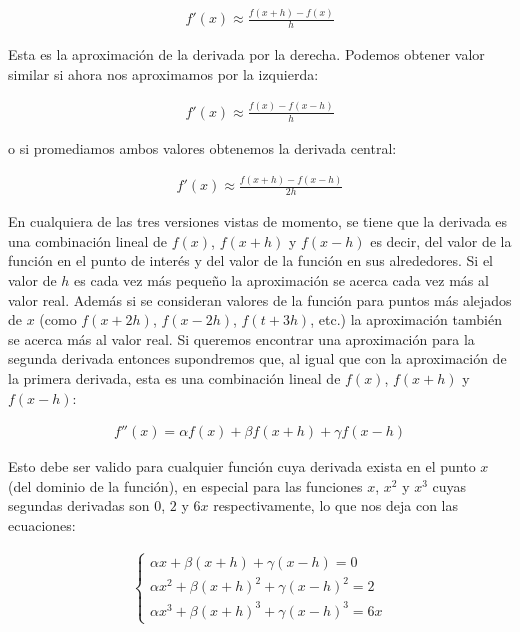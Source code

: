 \documentclass[12pt]{article}
\begin{document}
\begin{align*}
    f'(x) \approx\frac{f(x+h)-f(x)}{h}
\end{align*}

Esta es la aproximación de la derivada por la derecha. Podemos obtener valor similar si ahora nos aproximamos por la izquierda:

\begin{align*}
    f'(x) \approx\frac{f(x)-f(x-h)}{h}
\end{align*}

o si promediamos ambos valores obtenemos la derivada central:

\begin{align*}
    f'(x) \approx\frac{f(x+h)-f(x-h)}{2h}
\end{align*}

En cualquiera de las tres versiones vistas de momento, se tiene que la derivada es una combinación lineal de $f(x)$, $f(x+h)$ y $f(x-h)$ es decir, del valor de la función en el punto de interés y del valor de la función en sus alrededores. Si el valor de $h$ es cada vez más pequeño la aproximación se acerca cada vez más al valor real. Además si se consideran valores de la función para puntos más alejados de $x$ (como $f(x+2h)$, $f(x-2h)$, $f(t+3h)$, etc.) la aproximación también se acerca más al valor real. Si queremos encontrar una aproximación para la segunda derivada entonces supondremos que, al igual que con la aproximación de la primera derivada,  esta es una combinación lineal de $f(x)$, $f(x+h)$ y $f(x-h)$:

\begin{align*}
    f''(x) = \alpha f(x) + \beta f(x+h) + \gamma f(x-h)
\end{align*}

Esto debe ser valido para cualquier función cuya derivada exista en el punto $x$ (del dominio de la función), en especial para las funciones $x$, $x^2$ y $x^3$ cuyas segundas derivadas son $0$, $2$ y $6x$ respectivamente, lo que nos deja con las ecuaciones:

\begin{align}
    \begin{cases}
        \alpha x + \beta (x+h) + \gamma (x-h) = 0\\
        \alpha x^2 + \beta (x+h)^2 + \gamma (x-h)^2 = 2 \\
        \alpha x^3 + \beta (x+h)^3 + \gamma (x-h)^3 = 6x
    \end{cases}
\end{align}
\end{document}
